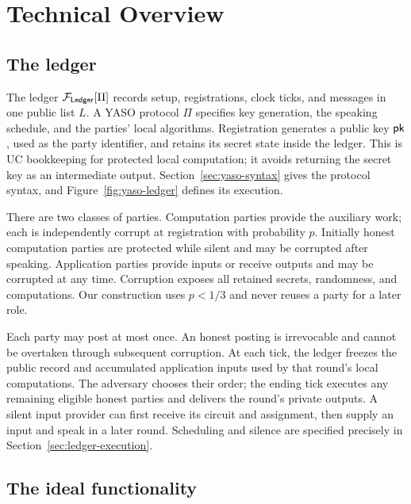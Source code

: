 \section{Technical Overview}
\label{sec:technical-overview}

\subsection{The ledger}
\label{sec:overview-ledger}

The ledger $\mathcal F_{\mathsf{Ledger}}[\Pi]$ records setup, registrations, clock ticks, and
messages in one public list $L$.  A YASO protocol $\Pi$ specifies key
generation, the speaking schedule, and the parties' local algorithms.
Registration generates a public key $\mathsf{pk}$, used as the party identifier,
and retains its secret state inside the ledger.  This is UC bookkeeping
for protected local computation; it avoids returning the secret key as
an intermediate output.  Section~\ref{sec:yaso-syntax} gives the protocol
syntax, and Figure~\ref{fig:yaso-ledger} defines its execution.

There are two classes of parties.  Computation parties provide the
auxiliary work; each is independently corrupt at registration with
probability $p$.  Initially honest computation parties are protected
while silent and may be corrupted after speaking.  Application parties
provide inputs or receive outputs and may be corrupted at any time.
Corruption exposes all retained secrets, randomness, and computations.
Our construction uses $p<1/3$ and never reuses a party for a later role.

Each party may post at most once.  An honest posting is irrevocable and
cannot be overtaken through subsequent corruption.  At each tick, the
ledger freezes the public record and accumulated application inputs used by
that round's local computations.  The adversary chooses their order;
the ending tick executes any remaining eligible honest parties and
delivers the round's private outputs.  A silent input provider can first
receive its circuit and assignment, then supply an input and speak in a
later round.  Scheduling and silence are
specified precisely in Section~\ref{sec:ledger-execution}.

\subsection{The ideal functionality}
\label{sec:overview-functionality}

